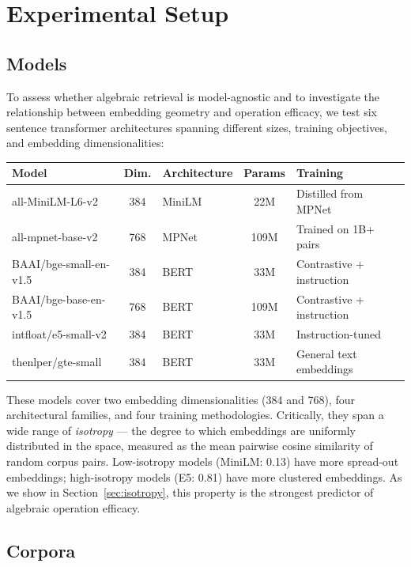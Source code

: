 \documentclass{article}
\begin{document}
\section{Experimental Setup}

\subsection{Models}

To assess whether algebraic retrieval is model-agnostic and to investigate the relationship between embedding geometry and operation efficacy, we test six sentence transformer architectures spanning different sizes, training objectives, and embedding dimensionalities:

\begin{table}[h]
\centering
\begin{tabular}{lclcl}
\toprule
Model & Dim. & Architecture & Params & Training \\
\midrule
all-MiniLM-L6-v2 & 384 & MiniLM & 22M & Distilled from MPNet \\
all-mpnet-base-v2 & 768 & MPNet & 109M & Trained on 1B+ pairs \\
BAAI/bge-small-en-v1.5 & 384 & BERT & 33M & Contrastive + instruction \\
BAAI/bge-base-en-v1.5 & 768 & BERT & 109M & Contrastive + instruction \\
intfloat/e5-small-v2 & 384 & BERT & 33M & Instruction-tuned \\
thenlper/gte-small & 384 & BERT & 33M & General text embeddings \\
\bottomrule
\end{tabular}
\end{table}

These models cover two embedding dimensionalities (384 and 768), four architectural families, and four training methodologies. Critically, they span a wide range of \emph{isotropy} --- the degree to which embeddings are uniformly distributed in the space, measured as the mean pairwise cosine similarity of random corpus pairs. Low-isotropy models (MiniLM: 0.13) have more spread-out embeddings; high-isotropy models (E5: 0.81) have more clustered embeddings. As we show in Section~\ref{sec:isotropy}, this property is the strongest predictor of algebraic operation efficacy.

\subsection{Corpora}
\end{document}
